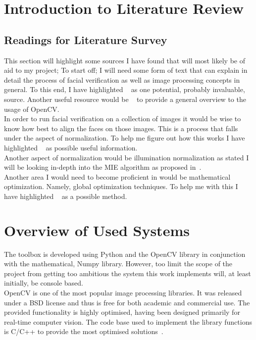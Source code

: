 \section{Introduction to Literature Review}
	\subsection{Readings for Literature Survey}
		This section will highlight some sources I have found that will most likely be of aid to my project; To start off; I 
		will need some form of text that can explain in detail the process of facial verification as well as image processing 
		concepts in general. To this end, I have highlighted ~\cite{szeliski2010computer} as one potential, probably invaluable, 
		source.  Another useful resource would be ~\cite{bradskeiLOCVwtOL} to provide a general overview to the usage of OpenCV. \\
		
		In order to run facial verification on a collection of images it would be wise to know how best to align the faces on 
		those images.  This is a process that falls under the aspect of normalization.  To help me figure out how this works I 
		have highlighted ~\cite{hasan2011improving} as possible useful information. \\
		
		Another aspect of normalization would be illumination normalization as stated I will be looking in-depth into the MIE 
		algorithm as proposed in~\cite{LuoaRINMBoMEfFR}.  \\
		
		Another area I would need to become proficient in would be mathematical optimization.  Namely, global optimization 
		techniques.  To help me with this I have highlighted ~\cite{Hungarian_alg}	as a possible method. \\
		
	\section{Overview of Used Systems}
		The toolbox is developed using Python and the OpenCV library in conjunction with the mathematical, 
		Numpy library.  However, too limit the scope of the project from getting too ambitious the system this 
		work implements will, at least initially, be console based. \\
		
		OpenCV is one of the most popular image processing libraries.  It was released under a BSD license 
		and thus is free for both academic and commercial use.  The provided functionality is highly optimised, 
		having been designed primarily for real-time computer vision.  The code base used to implement the 
		library functions is C/C++ to provide the most optimised solutions~\cite{OpenCVorg}.  \\
		

